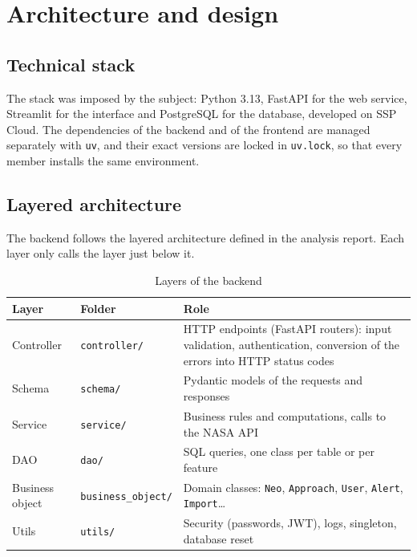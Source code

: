 \section{Architecture and design}
\label{sec:architecture}

\subsection{Technical stack}

The stack was imposed by the subject: Python 3.13, FastAPI for the web service, Streamlit for
the interface and PostgreSQL for the database, developed on SSP Cloud. The dependencies of the
backend and of the frontend are managed separately with \texttt{uv}, and their exact versions are
locked in \texttt{uv.lock}, so that every member installs the same environment.

\subsection{Layered architecture}

The backend follows the layered architecture defined in the analysis report. Each layer only
calls the layer just below it.

\begin{table}[H]
\centering
\small
\begin{tabularx}{\textwidth}{l l X}
\toprule
\textbf{Layer} & \textbf{Folder} & \textbf{Role} \\
\midrule
Controller & \texttt{controller/} & HTTP endpoints (FastAPI routers): input validation, authentication, conversion of the errors into HTTP status codes \\
Schema & \texttt{schema/} & Pydantic models of the requests and responses \\
Service & \texttt{service/} & Business rules and computations, calls to the NASA API \\
DAO & \texttt{dao/} & SQL queries, one class per table or per feature \\
Business object & \texttt{business\_object/} & Domain classes: \texttt{Neo}, \texttt{Approach}, \texttt{User}, \texttt{Alert}, \texttt{Import}\dots \\
Utils & \texttt{utils/} & Security (passwords, JWT), logs, singleton, database reset \\
\bottomrule
\end{tabularx}
\caption{Layers of the backend}
\end{table}

